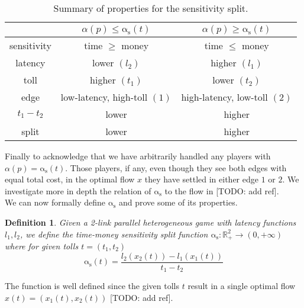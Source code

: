 \documentclass[a4paper,11pt]{article}
\newcommand{\as}{\mathrm{\alpha_s}}
\newtheorem{definition}{Definition}[section]
\begin{document}
\begin{table}[h!]
	\centering
	\caption{Summary of properties for the sensitivity split.}
	\begin{tabular}{| c || c | c |}
		\hline
		& $\alpha(p) \le \as(t)$ & $\alpha(p) \ge \as(t)$ \\ \hline
		sensitivity & time $\ge$ money & time $\le$ money \\ \hline
		latency & lower $(l_2)$ & higher $(l_1)$ \\ \hline
		toll & higher $(t_1)$ & lower $(t_2)$ \\ \hline
		edge & low-latency, high-toll $(1)$ & high-latency, low-toll $(2)$ \\ \hline
		$t_1 - t_2$ & lower & higher \\ \hline
		split & lower & higher \\ \hline
	\end{tabular}
	\label{table:split_summary}
\end{table}

Finally to acknowledge that we have arbitrarily handled any players with $\alpha(p) = \as(t)$.
Those players, if any, even though they see both edges with equal total cost, in the optimal flow $x$ they have settled in either edge $1$ or $2$.
We investigate more in depth the relation of $\as$ to the flow in [TODO: add ref].
\\[12pt]
We can now formally define $\as$ and prove some of its properties.
\begin{definition}
	Given a 2-link parallel heterogeneous game with latency functions $l_1, l_2$, we define the time-money sensitivity split function $\as: \mathbb{R}^2_+ \rightarrow (0, +\infty)$ where for given tolls $t = (t_1, t_2)$
	\[\as(t) = \frac{l_2(x_2(t)) - l_1(x_1(t))}{t_1 - t_2}\]
\end{definition}
The function is well defined since the given tolls $t$ result in a single optimal flow $x(t) = (x_1(t), x_2(t))$ [TODO: add ref].
\end{document}
